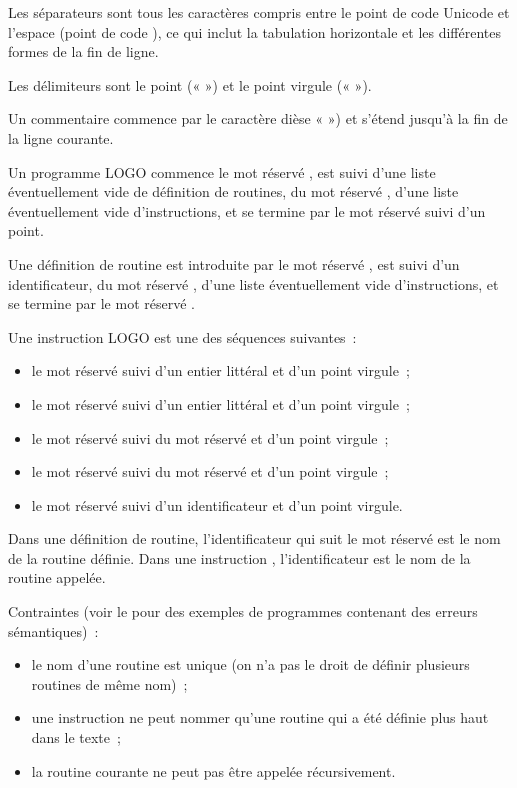 Les séparateurs sont tous les caractères compris entre le point de code Unicode  et l’espace (point de code ), ce qui inclut la tabulation horizontale et les différentes formes de la fin de ligne.

Les délimiteurs sont le point («  ») et le point virgule (« \tpp{;} »).

Un commentaire commence par le caractère dièse « \tpp{\#} ») et s'étend jusqu'à la fin de la ligne courante.



Un programme LOGO commence le mot réservé , est suivi d'une liste éventuellement vide de définition de routines, du mot réservé , d'une liste éventuellement vide d'instructions, et se termine par le mot réservé  suivi d'un point.

Une définition de routine est introduite par le mot réservé , est suivi d'un identificateur, du mot réservé , d'une liste éventuellement vide d'instructions, et se termine par le mot réservé .

Une instruction LOGO est une des séquences suivantes~:
\begin{itemize}
  \item le mot réservé  suivi d'un entier littéral et d'un point virgule~;
  \item le mot réservé  suivi d'un entier littéral et d'un point virgule~;
  \item le mot réservé  suivi du mot réservé  et d'un point virgule~;
  \item le mot réservé  suivi du mot réservé  et d'un point virgule~;
  \item le mot réservé  suivi d'un identificateur et d'un point virgule.
\end{itemize}


Dans une définition de routine, l'identificateur qui suit le mot réservé  est le nom de la routine définie. Dans une instruction , l'identificateur est le nom de la routine appelée.

Contraintes (voir le  pour des exemples de programmes contenant des erreurs sémantiques)~:
\begin{itemize}
  \item le nom d'une routine est unique (on n'a pas le droit de définir plusieurs routines de même nom)~;
  \item une instruction  ne peut nommer qu'une routine qui a été définie plus haut dans le texte~;
  \item la routine courante ne peut pas être appelée récursivement.
\end{itemize}

